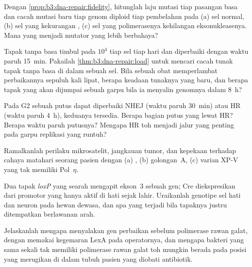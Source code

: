 \begin{exercise}[$\star\star$]\label{exo:b3:dna-repair:5}
Dengan \cref{prop:b3:dna-repair:fidelity}, hitunglah laju mutasi tiap
pasangan basa dan cacah mutasi baru tiap genom diploid tiap pembelahan pada
(a) sel normal, (b) sel yang kekurangan , (c) sel yang
polimerasenya kehilangan eksonukleasenya. Mana yang menjadi mutator yang
lebih berbahaya?
\end{exercise}

\begin{exercise}[$\star\star$]\label{exo:b3:dna-repair:6}
Tapak tanpa basa timbul pada $10^{4}$ tiap sel tiap hari dan diperbaiki
dengan waktu paruh \qty{15}{min}. Pakailah \cref{thm:b3:dna-repair:load}
untuk mencari cacah tunak tapak tanpa basa di dalam sebuah sel. Bila sebuah
obat memperlambat perbaikannya sepuluh kali lipat, berapa keadaan tunaknya
yang baru, dan berapa tapak yang akan dijumpai sebuah garpu bila ia menyalin
genomnya dalam \qty{8}{h}?
\end{exercise}

\begin{exercise}[$\star\star$]\label{exo:b3:dna-repair:7}
Pada G2 sebuah putus dapat diperbaiki NHEJ (waktu paruh \qty{30}{min}) atau
HR (waktu paruh \qty{4}{h}), keduanya tersedia. Berapa bagian putus yang
lewat HR? Berapa waktu paruh putusnya? Mengapa HR toh menjadi jalur yang
penting pada garpu replikasi yang runtuh?
\end{exercise}

\begin{exercise}[$\star\star$]\label{exo:b3:dna-repair:8}
Ramalkanlah perilaku mikrosatelit, jangkauan tumor, dan kepekaan terhadap
cahaya matahari seorang pasien dengan (a) , (b)
 golongan~A, (c) varian XP-V yang tak memiliki
Pol~$\eta$.
\end{exercise}

\begin{exercise}[$\star\star$]\label{exo:b3:dna-repair:9}
Dua tapak \emph{loxP} yang searah mengapit ekson~3 sebuah gen;
Cre diekspresikan dari promotor yang hanya aktif di hati sejak lahir.
Uraikanlah genotipe sel hati dan neuron pada hewan dewasa, dan apa yang
terjadi bila tapaknya justru ditempatkan berlawanan arah.
\end{exercise}

\begin{exercise}[$\star\star\star$]\label{exo:b3:dna-repair:10}
Jelaskanlah mengapa  menyalakan gen perbaikan sebelum
polimerase rawan galat, dengan memakai kegemaran LexA pada operatornya, dan
mengapa bakteri yang sama sekali tak memiliki polimerase rawan galat toh
mungkin berada pada posisi yang merugikan di dalam tubuh pasien yang diobati
antibiotik.
\end{exercise}

